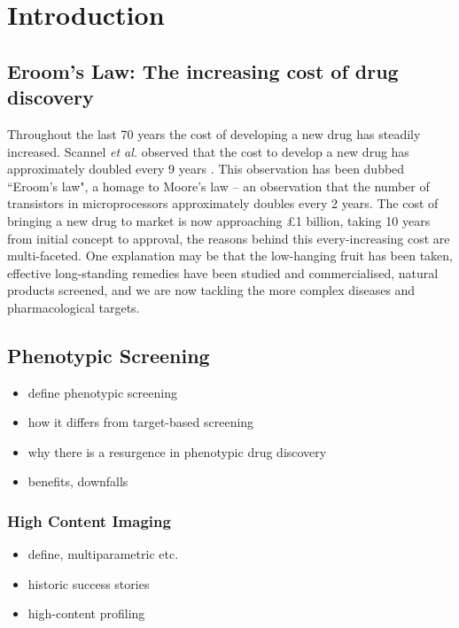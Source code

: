 \documentclass[a4paper,11pt,twoside,openright]{scrbook}
\begin{document}
\chapter{Introduction} \label{chapter:intro}

\section{Eroom's Law: The increasing cost of drug discovery}
Throughout the last 70 years the cost of developing a new drug has steadily increased.
Scannel \textit{et al.} observed that the cost to develop a new drug has approximately doubled every 9 years \cite{Scannell2012}.
This observation has been dubbed ``Eroom's law", a homage to Moore's law -- an observation that the number of transistors in microprocessors approximately doubles every 2 years.
The cost of bringing a new drug to market is now approaching £1 billion, taking 10 years from initial concept to approval, the reasons behind this every-increasing cost are multi-faceted.
One explanation may be that the low-hanging fruit has been taken, effective long-standing remedies have been studied and commercialised, natural products screened, and we are now tackling the more complex diseases and pharmacological targets.


\section{Phenotypic Screening}
\begin{itemize}
\item define phenotypic screening
\item how it differs from target-based screening
\item why there is a resurgence in phenotypic drug discovery
\item benefits, downfalls
\end{itemize}

\subsection{High Content Imaging}
\begin{itemize}
\item define, multiparametric etc.
\item historic success stories
\item high-content profiling
\end{itemize}
\end{document}
